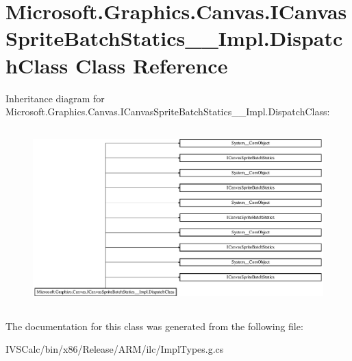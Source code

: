 \hypertarget{class_microsoft_1_1_graphics_1_1_canvas_1_1_i_canvas_sprite_batch_statics_____impl_1_1_dispatch_class}{}\section{Microsoft.\+Graphics.\+Canvas.\+I\+Canvas\+Sprite\+Batch\+Statics\+\_\+\+\_\+\+Impl.\+Dispatch\+Class Class Reference}
\label{class_microsoft_1_1_graphics_1_1_canvas_1_1_i_canvas_sprite_batch_statics_____impl_1_1_dispatch_class}
Inheritance diagram for Microsoft.\+Graphics.\+Canvas.\+I\+Canvas\+Sprite\+Batch\+Statics\+\_\+\+\_\+\+Impl.\+Dispatch\+Class\+:\begin{figure}[H]
\begin{center}
\leavevmode
\includegraphics[height=6.890380cm]{class_microsoft_1_1_graphics_1_1_canvas_1_1_i_canvas_sprite_batch_statics_____impl_1_1_dispatch_class}
\end{center}
\end{figure}


The documentation for this class was generated from the following file\+:\begin{DoxyCompactItemize}
\item 
I\+V\+S\+Calc/bin/x86/\+Release/\+A\+R\+M/ilc/Impl\+Types.\+g.\+cs\end{DoxyCompactItemize}
